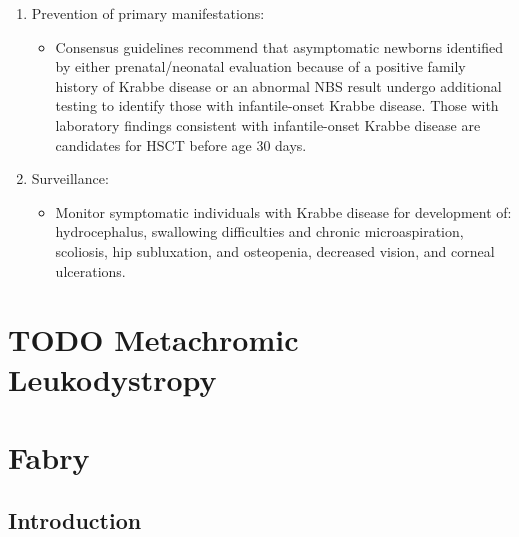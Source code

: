 \documentclass{scrartcl}
\begin{document}
\begin{enumerate}
\begin{enumerate}
\item Prevention of primary manifestations:
\label{sec:org7c811ba}
\begin{itemize}
\item Consensus guidelines recommend that asymptomatic newborns
identified by either prenatal/neonatal evaluation because of a
positive family history of Krabbe disease or an abnormal NBS
result undergo additional testing to identify those with
infantile-onset Krabbe disease. Those with laboratory findings
consistent with infantile-onset Krabbe disease are candidates for
HSCT before age 30 days.
\end{itemize}

\item Surveillance:
\label{sec:org4f409d1}
\begin{itemize}
\item Monitor symptomatic individuals with Krabbe disease for
development of: hydrocephalus, swallowing difficulties and chronic
microaspiration, scoliosis, hip subluxation, and osteopenia,
decreased vision, and corneal ulcerations.
\end{itemize}
\end{enumerate}
\end{enumerate}

\section{{\bfseries\sffamily TODO} Metachromic Leukodystropy}
\label{sec:orgd70d3b6}

\section{Fabry}
\label{sec:orgab316bc}
\subsection{Introduction}
\label{sec:org4946a2b}
\end{document}

